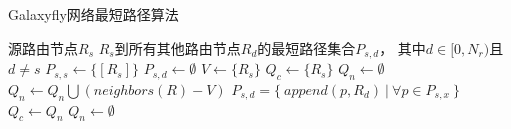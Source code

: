 

\begin{algorithm}[t]
  \caption{Galaxyfly网络最短路径算法}
  \label{alg:min}
  \begin{algorithmic}[1]
    \REQUIRE 源路由节点$R_s$
    \ENSURE $R_s$到所有其他路由节点$R_d$的最短路径集合$P_{s,d}$，
    其中$d \in [0, N_r)$且$d \neq s$
    \STATE $P_{s,s} \gets \lbrace [R_s] \rbrace$ \label{l:res.init.self}
    \FOR {$d \in [0, N_r) \land d \neq s$} \label{l:res.init.begin}
    \STATE $P_{s,d} \gets \emptyset$
    \ENDFOR \label{l:res.init.end}
    \STATE $V \gets \lbrace R_s \rbrace$ \label{l:v}
    \STATE $Q_c \gets \lbrace R_s \rbrace$ \label{l:qc}
    \STATE $Q_n \gets \emptyset$ \label{l:qn}
     \label{l:bfs.begin}
     \label{l:expand.begin}
    \STATE $Q_n \gets Q_n \bigcup (neighbors(R) - V)$
    \ENDFOR \label{l:expand.end}
     \label{l:rd}
     \label{l:rx}
    \STATE $P_{s,d} = \lbrace\ append(p, R_d)\ |\ \forall p \in P_{s,x}\ \rbrace$ \label{l:psd}
    \ENDFOR
    \ENDFOR
    \STATE $Q_c \gets Q_n$ \label{l:qc.update}
    \STATE $Q_n \gets \emptyset$ \label{l:qn.update}
    \ENDWHILE \label{l:bfs.end}
  \end{algorithmic}
\end{algorithm}

